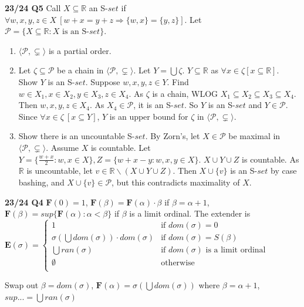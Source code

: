 \documentclass[10pt, landscape]{article}
\begin{document}
\begin{multicols*}{3}
\textbf{23/24 Q5} Call $X \subseteq \mathbb{R}$ an S-$set$ if $\forall w, x, y, z\in X\ [w+x=y+z\Longrightarrow\{w, x\}=\{y,z\}]$. Let $\mathcal{P}=\{X\subseteq \mathbb{R} : X \text{ is an S-$set$}\}$.
\begin{enumerate}
    \item $\langle \mathcal{P}, \subsetneq \rangle$ is a partial order.
    \item Let $\zeta \subseteq \mathcal{P}$ be a chain in $\langle \mathcal{P}, \subsetneq \rangle$. Let $Y=\bigcup \zeta$. $Y \subseteq \mathbb{R}$ as $\forall x \in \zeta[x\subseteq \mathbb{R}]$. Show $Y$ is an S-$set$. Suppose $w, x, y, z \in Y$. Find $w\in X_1, x \in X_2, y \in X_3, z \in X_4$. As $\zeta$ is a chain, WLOG $X_1\subseteq X_2\subseteq X_3 \subseteq X_4$. Then $w,x,y,z\in X_4$. As $X_4 \in \mathcal{P}$, it is an S-$set$. So $Y$ is an S-$set$ and $Y\in\mathcal{P}$. Since $\forall x \in \zeta \ [x \subseteq Y]$, $Y$ is an upper bound for $\zeta$ in $\langle \mathcal{P}, \subsetneq \rangle$.
    \item Show there is an uncountable S-$set$. By Zorn's, let $X \in \mathcal{P}$ be maximal in $\langle \mathcal{P}, \subsetneq \rangle$. Assume $X$ is countable. Let $Y=\{\frac{w+x}{2}:w,x \in X\}, Z=\{w+x-y:w,x,y\in X\}$. $X\cup Y\cup Z$ is countable. As $\mathbb{R}$ is uncountable, let $v\in \mathbb{R} \backslash (X\cup Y \cup Z)$. Then $X\cup\{v\}$ is an S-$set$ by case bashing, and $X\cup\{v\}\in \mathcal{P}$, but this contradicts maximality of $X$.
\end{enumerate}

\textbf{23/24 Q4} $\mathbf{F}(0)=1$, $\mathbf{F}(\beta)=\mathbf{F}(\alpha)\cdot\beta$ if $\beta=\alpha+1$, $\mathbf{F}(\beta)=sup\{\mathbf{F}(\alpha):\alpha<\beta\}$ if $\beta$ is a limit ordinal. The extender is $\mathbf{E}(\sigma) =
    \left\{
    \begin{array}{lr}
      1 & \text{if $dom(\sigma)=0$} \\
      \sigma(\bigcup dom(\sigma))\cdot dom(\sigma) & \text{if $dom(\sigma) =S(\beta)$} \\
      \bigcup ran(\sigma) & \text{if $dom(\sigma)$ is a limit ordinal} \\
      \emptyset & \text{otherwise}\\
    \end{array}
    \right.
    $

Swap out $\beta=dom(\sigma)$, $\mathbf{F}(\alpha)=\sigma(\bigcup dom(\sigma))$ where $\beta=\alpha+1$, $sup...=\bigcup ran(\sigma)$


\end{multicols*}
\end{document}
